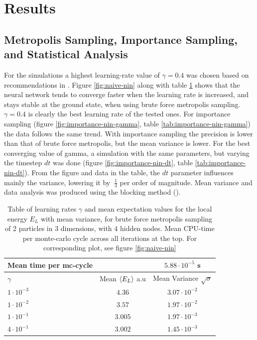 \section{Results}
\subsection{Metropolis Sampling, Importance Sampling, and Statistical Analysis}
For the simulations a highest learning-rate value of $\gamma = 0.4$ was chosen based on recommendations in \cite{Marsland}.
Figure \ref{fig:naive-nin} along with table \ref{tab:naive-nin} shows that the neural network tends to converge faster when the learning rate is increased,
and stays stable at the ground state, when using brute force metropolis sampling. $\gamma = 0.4$ is clearly the best learning rate of the tested ones.
For importance sampling (figure \ref{fig:importance-nin-gamma}, table \ref{tab:importance-nin-gamma})
the data follows the same trend. With importance sampling the precision is lower than that of brute
force metropolis, but the mean variance is lower.
For the best converging value of gamma, a simulation with the same parameters, but varying the
timestep $dt$ was done (figure \ref{fig:importance-nin-dt}, table \ref{tab:importance-nin-dt}).
From the figure and data in the table, the $dt$ parameter influences mainly the variance,
lowering it by $~\frac{1}{3}$ per order of magnitude.
Mean variance and data analysis was produced using the blocking method (\cite{Lectures-blocking}).

\begin{table}[h]
\begin{tabular}{l c c}
	Mean time per mc-cycle & &$5.88\cdot10^{-5}$ s \\
	\hline
	$\gamma$ & Mean $\langle E_L \rangle$ a.u & Mean Variance $\sqrt{\sigma}$\\
	\hline
	$1\cdot10^{-3}$ & $4.36$ & $3.07\cdot10^{-2}$ \\
	$1\cdot10^{-2}$ & $3.57$ & $1.97\cdot10^{-2}$ \\
	$1\cdot10^{-1}$ & $3.005$ & $1.97\cdot10^{-3}$ \\
	$4\cdot10^{-1}$ & $3.002$ & $1.45\cdot10^{-3}$ \\
\end{tabular}
\label{tab:naive-nin}
\caption{Table of learning rates $\gamma$ and mean expectation values for the local energy $E_L$ with mean variance, for brute force metropolis sampling
		of 2 particles in 3 dimensions, with 4 hidden nodes.
		Mean CPU-time per monte-carlo cycle across all iterations at the top.
	For corresponding plot, see figure \ref{fig:naive-nin}}
\end{table}

